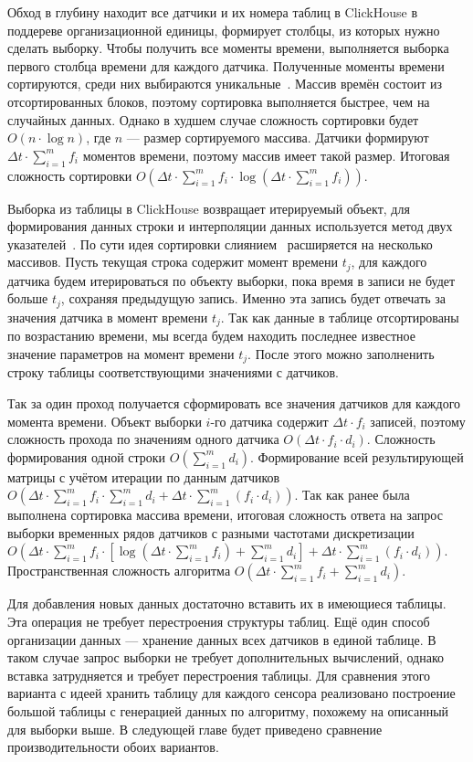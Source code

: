 Обход в глубину находит все датчики и их номера таблиц в ClickHouse в поддереве организационной единицы, формирует столбцы, из которых нужно сделать выборку. Чтобы получить все моменты времени, выполняется выборка первого столбца времени для каждого датчика. Полученные моменты времени сортируются, среди них выбираются уникальные~\cite{np-unique}. Массив времён состоит из отсортированных блоков, поэтому сортировка выполняется быстрее, чем на случайных данных. Однако в худшем случае сложность сортировки будет $O(n \cdot \log{n})$, где $n$ --- размер сортируемого массива. Датчики формируют ${\Delta}t \cdot \sum^{m}_{i=1}{f_i}$ моментов времени, поэтому массив имеет такой размер. Итоговая сложность сортировки $O({\Delta}t \cdot \sum^{m}_{i=1}{f_i} \cdot \log{({\Delta}t \cdot \sum^{m}_{i=1}{f_i})})$.

Выборка из таблицы в ClickHouse возвращает итерируемый объект, для формирования данных строки и интерполяции данных используется метод двух указателей~\cite{two-pointers}. По сути идея сортировки слиянием~\cite{mergesort} расширяется на несколько массивов. Пусть текущая строка содержит момент времени $t_j$, для каждого датчика будем итерироваться по объекту выборки, пока время в записи не будет больше $t_j$, сохраняя предыдущую запись. Именно эта запись будет отвечать за значения датчика в момент времени $t_j$. Так как данные в таблице отсортированы по возрастанию времени, мы всегда будем находить последнее известное значение параметров на момент времени $t_j$. После этого можно заполненить строку таблицы соответствующими значениями с датчиков.

Так за один проход получается сформировать все значения датчиков для каждого момента времени. Объект выборки $i$-го датчика содержит ${\Delta}t \cdot f_i$ записей, поэтому сложность прохода по значениям одного датчика $O({\Delta}t \cdot f_i \cdot d_i)$. Сложность формирования одной строки $O(\sum^{m}_{i=1}{d_i})$. Формирование всей результирующей матрицы с учётом итерации по данным датчиков $O({\Delta}t \cdot \sum^{m}_{i=1}{f_i} \cdot \sum^{m}_{i=1}{d_i} + {\Delta}t \cdot \sum^{m}_{i=1}{(f_i \cdot d_i)})$. Так как ранее была выполнена сортировка массива времени, итоговая сложность ответа на запрос выборки временных рядов датчиков с разными частотами дискретизации $O({\Delta}t \cdot \sum^{m}_{i=1}{f_i} \cdot [\log({\Delta}t \cdot \sum^{m}_{i=1}{f_i}) + \sum^{m}_{i=1}{d_i}] + {\Delta}t \cdot \sum^{m}_{i=1}{(f_i \cdot d_i)})$. Пространственная сложность алгоритма $O({\Delta}t \cdot \sum^{m}_{i=1}{f_i} + \sum^{m}_{i=1}{d_i})$.

Для добавления новых данных достаточно вставить их в имеющиеся таблицы. Эта операция не требует перестроения структуры таблиц. Ещё один способ организации данных --- хранение данных всех датчиков в единой таблице. В таком случае запрос выборки не требует дополнительных вычислений, однако вставка затрудняется и требует перестроения таблицы. Для сравнения этого варианта с идеей хранить таблицу для каждого сенсора реализовано построение большой таблицы с генерацией данных по алгоритму, похожему на описанный для выборки выше. В следующей главе будет приведено сравнение производительности обоих вариантов.